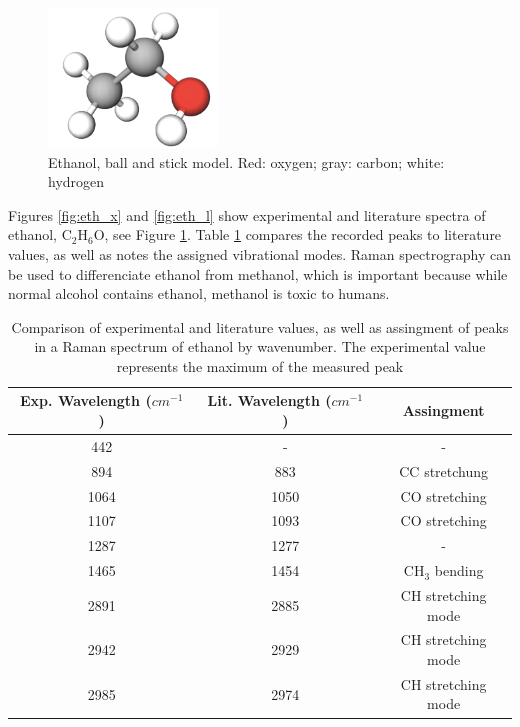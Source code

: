     \begin{figure} %
        \centering
        \vspace{-20pt}
        \includegraphics[width=0.4\textwidth]{images/raman_spectra/eth_i.png}
        \caption{Ethanol, ball and stick model. Red: oxygen; gray: carbon; white: hydrogen}
        \label{fig:eth_i}
    \end{figure}


    Figures \ref{fig:eth_x} and \ref{fig:eth_l} show experimental and literature spectra of ethanol, C\(_2\)H\(_6\)O, see Figure \ref{fig:eth_i}.  Table \ref{table:eth} compares the recorded peaks to literature values, as well as notes the assigned vibrational modes. Raman spectrography can be used to differenciate ethanol from methanol, which is important because while normal alcohol contains ethanol, methanol is toxic to humans.

    \begin{table}[h]
    \begin{center}
        \vspace{15pt}
        \begin{tabular}{|c|c|c|}
         \hline
         Exp. Wavelength (\( cm^{-1} \) ) & Lit. Wavelength  (\( cm^{-1} \) ) & Assingment  \\ 
         \hline
         442 & - & - \\
         894 & 883 & CC stretchung \\ 
         1064 & 1050 & CO stretching\\
         1107 & 1093 & CO stretching\\
         1287 & 1277 & - \\
         1465 & 1454 & CH\(_3\) bending\\
         2891& 2885 &  CH stretching mode\\
         2942 & 2929 & CH stretching mode\\
         2985 & 2974 & CH stretching mode\\
         
         \hline
        \end{tabular}
        \caption{Comparison of experimental and literature \cite{ethl1} \cite{ethl2} values, as well as assingment of peaks in a Raman spectrum of ethanol by wavenumber. The experimental value represents the maximum of the measured peak }
        \label{table:eth}
    \end{center}
    \end{table}

